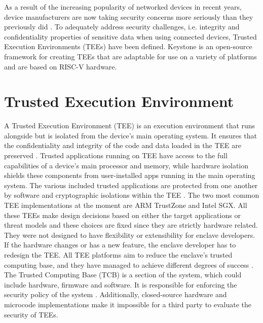 
As a result of the increasing popularity of networked devices in recent years, device manufacturers are now taking security concerns more seriously than they previously did \cite{IntroTEE}. 
To adequately address security challenges, i.e. integrity and confidentiality properties of sensitive data when using connected devices, Trusted Execution Environments (TEEs) have been defined. Keystone \cite{lee2020keystone} is an open-source framework for creating TEEs that are adaptable for use on a variety of platforms and are based on RISC-V hardware. 

\section{Trusted Execution Environment}
A Trusted Execution Environment (TEE) is an execution environment that runs alongside but is isolated from the device's main operating system.
It ensures that the confidentiality and integrity of the code and data loaded in the TEE are preserved \cite{TEEpaper}. 
Trusted applications running on TEE have access to the full capabilities of a device's main processor and memory, while hardware isolation shields these components from user-installed apps running in the main operating system. The various included trusted applications are protected from one another by software and cryptographic isolations within the TEE \cite{IntroTEE}.
The two most common TEE implementations at the moment are ARM TrustZone and Intel SGX. All these TEEs make design decisions based on either the target applications or threat models and these choices are fixed since they are strictly hardware related. They were not designed to have flexibility or extensibility for enclave developers. If the hardware changes or has a new feature, the enclave developer has to redesign the TEE.
All TEE platforms aim to reduce the enclave's trusted computing base, and they have managed to achieve different degrees of success \cite{keysyone-blog-1}. The Trusted Computing Base (TCB) is a section of the system, which could include hardware, firmware and software. It is responsible for enforcing the security policy of the system \cite{tcb-def}. Additionally, closed-source hardware and microcode implementations make it impossible for a third party to evaluate the security of TEEs.

